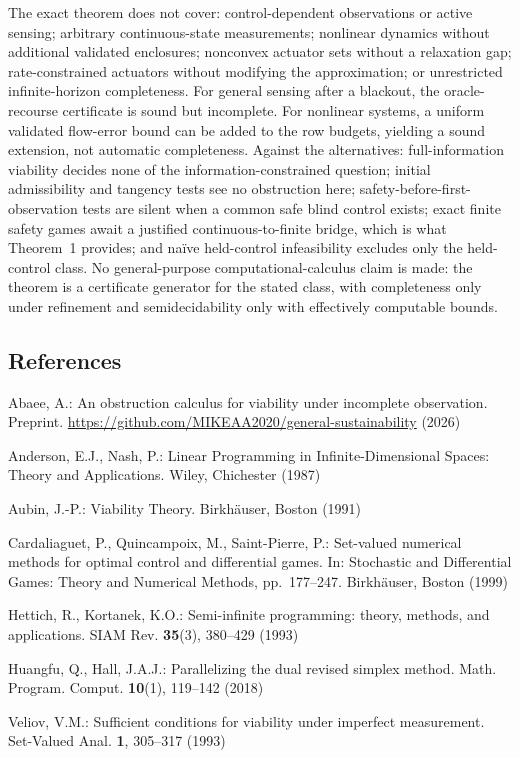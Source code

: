 \documentclass[10pt,twocolumn]{article}
\theoremstyle{definition}
\begin{document}
The exact theorem does not cover: control-dependent observations or active
sensing; arbitrary continuous-state measurements; nonlinear dynamics without
additional validated enclosures; nonconvex actuator sets without a relaxation
gap; rate-constrained actuators without modifying the approximation; or
unrestricted infinite-horizon completeness. For general sensing after a
blackout, the oracle-recourse certificate is sound but incomplete. For
nonlinear systems, a uniform validated flow-error bound can be added to the
row budgets, yielding a sound extension, not automatic completeness. Against
the alternatives: full-information viability decides none of the
information-constrained question; initial admissibility and tangency tests
see no obstruction here; safety-before-first-observation tests are silent
when a common safe blind control exists; exact finite safety games await a
justified continuous-to-finite bridge, which is what Theorem~1 provides; and
na\"ive held-control infeasibility excludes only the held-control class.
No general-purpose computational-calculus claim is made: the theorem is a
certificate generator for the stated class, with completeness only under
refinement and semidecidability only with effectively computable bounds.

\subsection{References}\label{references}
{\footnotesize

Abaee, A.: An obstruction calculus for viability under incomplete observation.
Preprint. \url{https://github.com/MIKEAA2020/general-sustainability} (2026)

Anderson, E.J., Nash, P.: Linear Programming in Infinite-Dimensional Spaces:
Theory and Applications. Wiley, Chichester (1987)

Aubin, J.-P.: Viability Theory. Birkh\"auser, Boston (1991)

Cardaliaguet, P., Quincampoix, M., Saint-Pierre, P.: Set-valued numerical
methods for optimal control and differential games. In: Stochastic and
Differential Games: Theory and Numerical Methods, pp.~177--247. Birkh\"auser,
Boston (1999)

Hettich, R., Kortanek, K.O.: Semi-infinite programming: theory, methods, and
applications. SIAM Rev. \textbf{35}(3), 380--429 (1993)

Huangfu, Q., Hall, J.A.J.: Parallelizing the dual revised simplex method.
Math. Program. Comput. \textbf{10}(1), 119--142 (2018)

Veliov, V.M.: Sufficient conditions for viability under imperfect
measurement. Set-Valued Anal. \textbf{1}, 305--317 (1993)

}
\end{document}

